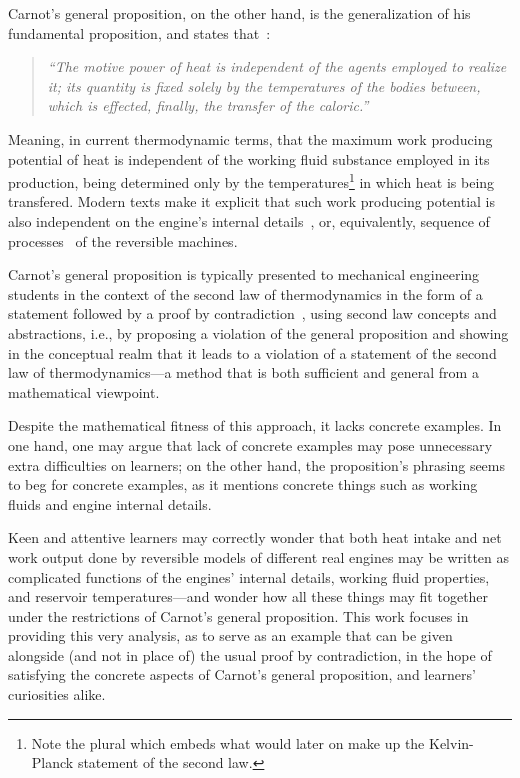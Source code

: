     Carnot's general proposition, on the other hand, is the generalization  of  his  fundamental
    proposition, and states that~\cite[p.~68]{1897-ThurstonRH-Wiley}:

    \begin{quote}
        \it
        ``The motive power of heat is independent of the agents employed
        to realize it; its quantity is fixed solely by the  temperatures
        of the bodies between, which is effected, finally, the  transfer
        of the caloric.''
    \end{quote}

    Meaning, in current thermodynamic terms, that the maximum work producing potential  of  heat
    is independent of the working fluid substance employed in its production,  being  determined
    only by the temperatures\footnote{Note the plural which embeds what would later on  make  up
    the Kelvin-Planck statement of the second law.} in which heat is  being  transfered.  Modern
    texts make it explicit that such  work  producing  potential  is  also  independent  on  the
    engine's internal details~\cite{2013-CengelYA+BolesMA-AMGH}, or, equivalently,  sequence  of
    processes~\cite{2002-MoranMJ+ShapiroHN-LTC} of the reversible machines.

    Carnot's general proposition is typically presented to mechanical  engineering  students  in
    the context of the second law of thermodynamics in the form of a  statement  followed  by  a
    proof   by    contradiction~\cite{2013-CengelYA+BolesMA-AMGH,    2002-MoranMJ+ShapiroHN-LTC,
    1986-JonesJB+HawkinsGA-Wiley},  using  second  law  concepts  and  abstractions,  i.e.,   by
    proposing a violation of the general proposition and showing in the conceptual realm that it
    leads to a violation of a statement of the second law of thermodynamics---a method  that  is
    both sufficient and general from a mathematical viewpoint.

    Despite the mathematical fitness of this approach, it lacks concrete examples. In one  hand,
    one may argue that lack of concrete examples may  pose  unnecessary  extra  difficulties  on
    learners; on the other hand, the proposition's phrasing seems to beg for concrete  examples,
    as it mentions concrete things such as working fluids and engine internal details.

    Keen and attentive learners may correctly wonder that both heat intake and net  work  output
    done by reversible models of different real engines may be written as complicated  functions
    of the engines' internal details, working fluid properties, and reservoir temperatures---and
    wonder how all these things may fit together under  the  restrictions  of  Carnot's  general
    proposition. This work focuses in providing this very analysis, as to serve  as  an  example
    that can be given alongside (and not in place of) the usual proof by contradiction,  in  the
    hope of satisfying the concrete aspects  of  Carnot's  general  proposition,  and  learners'
    curiosities alike.

